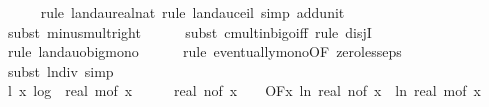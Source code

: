 \begin{isabellebody}
\ \ \ \ \isamarkupfalse%
\ {\isacharparenleft}{\kern0pt}rule\ landau{\isacharunderscore}{\kern0pt}real{\isacharunderscore}{\kern0pt}nat{\isacharcomma}{\kern0pt}\ rule\ landau{\isacharunderscore}{\kern0pt}ceil{\isacharcomma}{\kern0pt}\ simp\ add{\isacharcolon}{\kern0pt}unit{\isacharunderscore}{\kern0pt}{}{\isacharparenright}{\kern0pt}\isanewline
\ \ \ \ \isamarkupfalse%
\ {\isacharparenleft}{\kern0pt}subst\ minus{\isacharunderscore}{\kern0pt}mult{\isacharunderscore}{\kern0pt}right{\isacharparenright}{\kern0pt}\isanewline
\ \ \ \ \isamarkupfalse%
\ {\isacharparenleft}{\kern0pt}subst\ cmult{\isacharunderscore}{\kern0pt}in{\isacharunderscore}{\kern0pt}bigo{\isacharunderscore}{\kern0pt}iff{\isacharcomma}{\kern0pt}\ rule\ disjI{}{\isacharparenright}{\kern0pt}\isanewline
\ \ \ \ \isamarkupfalse%
\ {\isacharparenleft}{\kern0pt}rule\ landau{\isacharunderscore}{\kern0pt}o{\isachardot}{\kern0pt}big{\isacharunderscore}{\kern0pt}mono{\isacharparenright}{\kern0pt}\isanewline
\ \ \ \ \isamarkupfalse%
\ {\isacharparenleft}{\kern0pt}rule\ eventually{\isacharunderscore}{\kern0pt}mono{\isacharbrackleft}{\kern0pt}OF\ zero{\isacharunderscore}{\kern0pt}less{\isacharunderscore}{\kern0pt}eps{\isacharbrackright}{\kern0pt}{\isacharparenright}{\kern0pt}\isanewline
\ \ \ \ \isamarkupfalse%
\ {\isacharparenleft}{\kern0pt}subst\ ln{\isacharunderscore}{\kern0pt}div{\isacharcomma}{\kern0pt}\ simp{\isacharplus}{\kern0pt}{\isacharparenright}{\kern0pt}\isanewline
\isanewline
\ \ \isamarkupfalse%
\ l{}{\isacharcolon}{\kern0pt}\ {\isachardoublequoteopen}{\isacharparenleft}{\kern0pt}{\isasymlambda}x{\isachardot}{\kern0pt}\ log\ {}\ {\isacharparenleft}{\kern0pt}real\ {\isacharparenleft}{\kern0pt}m{\isacharunderscore}{\kern0pt}of\ x{\isacharparenright}{\kern0pt}\ {\isacharasterisk}{\kern0pt}\ {\isacharparenleft}{\kern0pt}{}\ {\isacharplus}{\kern0pt}\ {}\ {\isacharasterisk}{\kern0pt}\ real\ {\isacharparenleft}{\kern0pt}n{\isacharunderscore}{\kern0pt}of\ x{\isacharparenright}{\kern0pt}{\isacharparenright}{\kern0pt}\ {\isacharplus}{\kern0pt}\ {}{\isacharparenright}{\kern0pt}{\isacharparenright}{\kern0pt}\ {\isasymin}\ O{\isacharbrackleft}{\kern0pt}{\isacharquery}{\kern0pt}F{\isacharbrackright}{\kern0pt}{\isacharparenleft}{\kern0pt}{\isasymlambda}x{\isachardot}{\kern0pt}\ ln\ {\isacharparenleft}{\kern0pt}real\ {\isacharparenleft}{\kern0pt}n{\isacharunderscore}{\kern0pt}of\ x{\isacharparenright}{\kern0pt}{\isacharparenright}{\kern0pt}\ {\isacharplus}{\kern0pt}\ ln\ {\isacharparenleft}{\kern0pt}real\ {\isacharparenleft}{\kern0pt}m{\isacharunderscore}{\kern0pt}of\ x{\isacharparenright}{\kern0pt}{\isacharparenright}{\kern0pt}{\isacharparenright}{\kern0pt}{\isachardoublequoteclose}\isanewline

\end{isabellebody}
